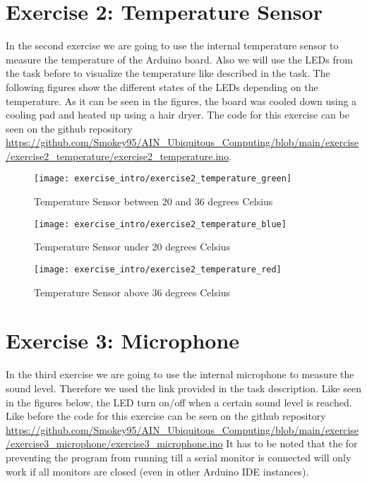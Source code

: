 \section{Exercise 2: Temperature Sensor}

In the second exercise we are going to use the internal temperature sensor to measure the temperature of the Arduino board.
Also we will use the LEDs from the task before to visualize the temperature like described in the task.
\newline
\newline
The following figures show the different states of the LEDs depending on the temperature.
As it can be seen in the figures, the board was cooled down using a cooling pad and heated up using a hair dryer.
\newline
The code for this exercise can be seen on the github repository \url{https://github.com/Smokey95/AIN_Ubiquitous_Computing/blob/main/exercise/exercise2_temperature/exercise2_temperature.ino}.


\begin{figure}[h!]
    \centering
    \texttt{[image: exercise\_intro/exercise2\_temperature\_green]}
    \caption{Temperature Sensor between 20 and 36 degrees Celsius}
    \label{fig:temperature_sensor_green}
\end{figure}

\begin{figure}[h!]
  \centering
  \texttt{[image: exercise\_intro/exercise2\_temperature\_blue]}
  \caption{Temperature Sensor under 20 degrees Celsius}
  \label{fig:temperature_sensor_blue}
\end{figure}

\begin{figure}[h!]
  \centering
  \texttt{[image: exercise\_intro/exercise2\_temperature\_red]}
  \caption{Temperature Sensor above 36 degrees Celsius}
  \label{fig:temperature_sensor_red}
\end{figure}

\newpage

\section{Exercise 3: Microphone}

In the third exercise we are going to use the internal microphone to measure the sound level.
Therefore we used the link provided in the task description.
Like seen in the figures below, the LED turn on/off when a certain sound level is reached.
\newline
\newline
Like before the code for this exercise can be seen on the github repository \url{https://github.com/Smokey95/AIN_Ubiquitous_Computing/blob/main/exercise/exercise3_microphone/exercise3_microphone.ino}
It has to be noted that the  for preventing the program from running till a serial monitor is connected will only work 
if all monitors are closed (even in other Arduino IDE instances).

